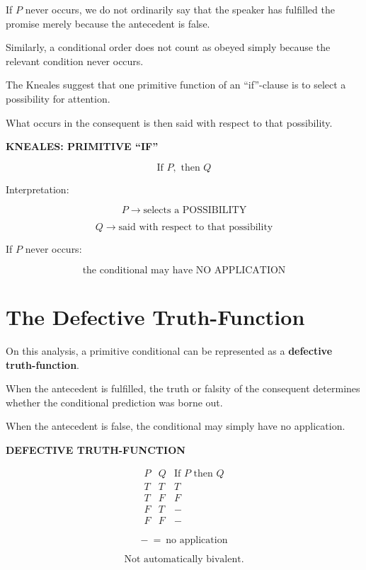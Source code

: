 \documentclass[11pt]{article}
\begin{document}
If \(P\) never occurs, we do not ordinarily say that the speaker
has fulfilled the promise merely because the antecedent is false.

Similarly, a conditional order does not count as obeyed simply
because the relevant condition never occurs.

The Kneales suggest that one primitive function of an
``if''-clause is to select a possibility for attention.

What occurs in the consequent is then said with respect to that
possibility.

\begin{whiteboard}
\textbf{KNEALES: PRIMITIVE ``IF''}

\[
\text{If }P,\text{ then }Q
\]

Interpretation:

\[
P
\rightarrow
\text{selects a POSSIBILITY}
\]

\[
Q
\rightarrow
\text{said with respect to that possibility}
\]

If \(P\) never occurs:

\[
\boxed{\text{the conditional may have NO APPLICATION}}
\]
\end{whiteboard}

\section{The Defective Truth-Function}

On this analysis, a primitive conditional can be represented as
a \textbf{defective truth-function}.

When the antecedent is fulfilled, the truth or falsity of the
consequent determines whether the conditional prediction was
borne out.

When the antecedent is false, the conditional may simply have no
application.

\begin{whiteboard}
\textbf{DEFECTIVE TRUTH-FUNCTION}

\[
\begin{array}{c|c|c}
P & Q & \text{If }P\text{ then }Q\\
\hline
T & T & T\\
T & F & F\\
F & T & -\\
F & F & -
\end{array}
\]

\[
-\ =\ \text{no application}
\]

\[
\boxed{\text{Not automatically bivalent.}}
\]
\end{whiteboard}
\end{document}
